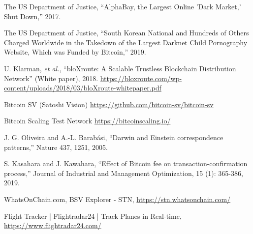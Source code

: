 \documentclass[graybox]{svmult}
\begin{document}
\begin{thebibliography}{99}
  The US Department of Justice,
  ``AlphaBay, the Largest Online 'Dark Market,' Shut Down,'' 2017.

  The US Department of Justice,
  ``South Korean National and Hundreds of Others Charged Worldwide in the Takedown 
    of the Largest Darknet Child Pornography Website, Which was Funded by Bitcoin,'' 
  2019.



  U. Klarman, \textit{et al.},
  ``bloXroute: A Scalable Trustless Blockchain Distribution Network''
  (White paper), 2018.
  \url{https://bloxroute.com/wp-content/uploads/2018/03/bloXroute-whitepaper.pdf}


  Bitcoin SV (Satoshi Vision) 
  \url{https://github.com/bitcoin-sv/bitcoin-sv}

  Bitcoin Scaling Test Network
  \url{https://bitcoinscaling.io/}




  J. G. Oliveira and A.-L. Barab\'asi,
  ``Darwin and Einstein correspondence patterns,'' 
  Nature 437, 1251, 2005.


  S. Kasahara and J. Kawahara,
  ``Effect of Bitcoin fee on transaction-confirmation process,''
  Journal of Industrial and Management Optimization, 15 (1): 365-386, 2019.


  WhatsOnChain.com, BSV Explorer - STN,
  \url{https://stn.whatsonchain.com/}



  Flight Tracker | Flightradar24 | Track Planes in Real-time,
  \url{https://www.flightradar24.com/}



\end{thebibliography}
\end{document}
